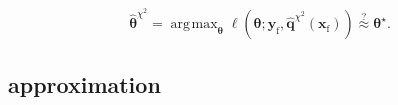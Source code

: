\documentclass[english,xcolor={rgb,dvipsnames,table,usenames}, presentation]{beamer}
\DeclareMathOperator*{\argmax}{\arg\!\max}
\newcommand\q{{\bm{q}}}
\begin{document}
\begin{frame}
\begin{minipage}[c]{0.15\linewidth}
\begin{animateinline}{2}%
{\color{orange}{\bf CACF}}%
\newframe \end{animateinline}
\end{minipage}
\begin{minipage}[c]{0.8\linewidth}
\[ \hat{\bm{\theta}}^{\chi^2} = \argmax_{\bm{\theta}} \ell(\bm{\theta} ; \mathbf{y}_\text{f}, {\hat{\q}^{\chi^2}}(\mathbf{x}_\text{f})) \stackrel{?}{\approx} \bm{\theta}^\star. \]
\end{minipage}

\end{frame}






\subsection{approximation}
\end{document}
